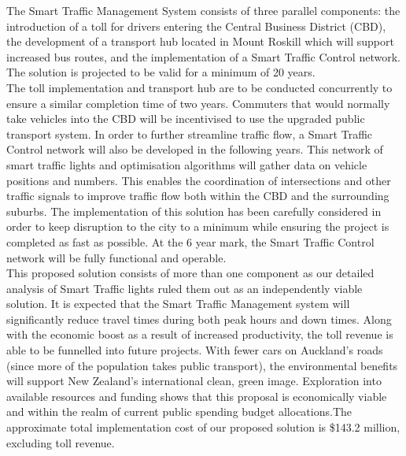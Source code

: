 \documentclass[twoside, a4paper, 11pt]{article}
\begin{document}
The Smart Traffic Management System consists of three parallel components: the introduction of a toll for drivers entering the Central Business District (CBD), the development of a transport hub located in Mount Roskill which will support increased bus routes, and the implementation of a Smart Traffic Control network. The solution is projected to be valid for a minimum of 20 years. \\

The toll implementation and transport hub are to be conducted concurrently to ensure a similar completion time of two years. Commuters that would normally take vehicles into the CBD will be incentivised to use the upgraded public transport system. In order to further streamline traffic flow, a Smart Traffic Control network will also be developed in the following years. This network of smart traffic lights and optimisation algorithms will gather data on vehicle positions and numbers. This enables the coordination of intersections and other traffic signals to improve traffic flow both within the CBD and the surrounding suburbs. The implementation of this solution has been carefully considered in order to keep disruption to the city to a minimum while ensuring the project is completed as fast as possible. At the 6 year mark, the Smart Traffic Control network will be fully functional and operable.\\

This proposed solution consists of more than one component as our detailed analysis of Smart Traffic lights ruled them out as an independently viable solution. It is expected that the Smart Traffic Management system will significantly reduce travel times during both peak hours and down times. Along with the economic boost as a result of increased productivity, the toll revenue is able to be funnelled into future projects. With fewer cars on Auckland's roads (since more of the population takes public transport), the environmental benefits will support New Zealand's international clean, green image. Exploration into available resources and funding shows that this proposal is economically viable and within the realm of current public spending budget allocations.The approximate total implementation cost of our proposed solution is \$143.2 million, excluding toll revenue.\\
\end{document}
